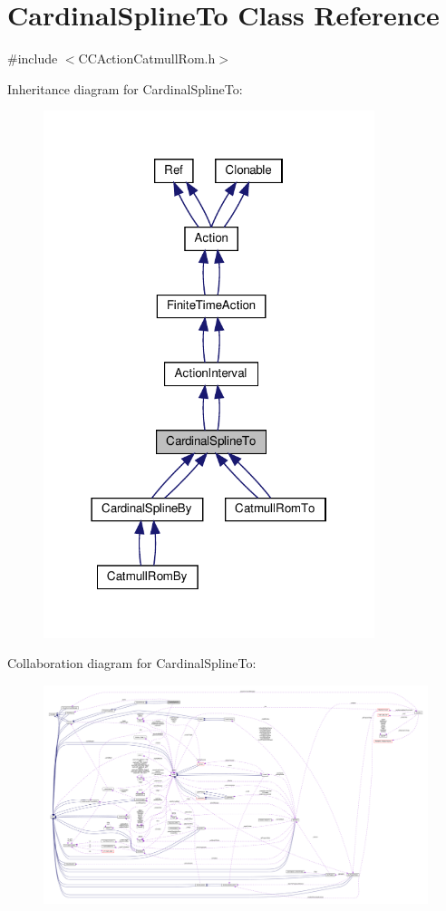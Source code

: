 \hypertarget{classCardinalSplineTo}{}\section{Cardinal\+Spline\+To Class Reference}
\label{classCardinalSplineTo}


{\ttfamily \#include $<$C\+C\+Action\+Catmull\+Rom.\+h$>$}



Inheritance diagram for Cardinal\+Spline\+To\+:
\nopagebreak
\begin{figure}[H]
\begin{center}
\leavevmode
\includegraphics[width=274pt]{classCardinalSplineTo__inherit__graph}
\end{center}
\end{figure}


Collaboration diagram for Cardinal\+Spline\+To\+:
\nopagebreak
\begin{figure}[H]
\begin{center}
\leavevmode
\includegraphics[width=350pt]{classCardinalSplineTo__coll__graph}
\end{center}
\end{figure}
